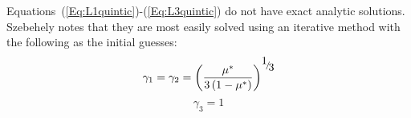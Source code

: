 Equations~(\ref{Eq:L1quintic})-(\ref{Eq:L3quintic})  do not have
exact analytic solutions.%
Szebehely\cite{Szebehely67}  notes that they are most easily solved
using an iterative method with the following as the initial guesses:
%
\begin{equation}
\gamma _1  = \gamma _2  = \left( {\frac{\mu^*} {{3\left( {1 - \mu^*}
\right)}}} \right)^{{\raise0.7ex\hbox{$1$} \!\mathord{\left/
 {\vphantom {1 3}}\right.\kern-\nulldelimiterspace}
\!\lower0.7ex\hbox{$3$}}}
\end{equation}
%
\begin{equation}
\gamma _3  = 1
\end{equation}

